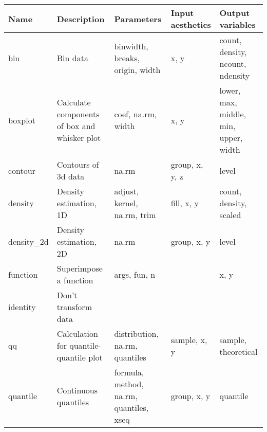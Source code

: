 \begin{table}
  \begin{center}
  \begin{tabular}{lp{1.5in}p{2in}p{1in}p{1.5in}}
    \toprule
    Name & Description & Parameters & Input \newline aesthetics & Output \newline variables \\
    \midrule
    bin          & Bin data                                                    & binwidth, breaks, origin, width                & x, y                            & count, density, ncount, ndensity     \\
    boxplot      & Calculate components of box and whisker plot                & coef, na.rm, width                             & x, y                            & lower, max, middle, min, upper, width\\
    contour      & Contours of 3d data                                         & na.rm                                          & group, x, y, z                  & level                                \\
    density      & Density estimation, 1D                                      & adjust, kernel, na.rm, trim                    & fill, x, y                      & count, density, scaled               \\
    density\_2d & Density estimation, 2D                                      & na.rm                                          & group, x, y                     & level                                \\
    function     & Superimpose a function                                      & args, fun, n                                   &                                 & x, y                                 \\
    identity     & Don't transform data                                        &                                                &                                 &                                      \\
    qq           & Calculation for quantile-quantile plot                      & distribution, na.rm, quantiles                 & sample, x, y                    & sample, theoretical                  \\
    quantile     & Continuous quantiles                                        & formula, method, na.rm, quantiles, xseq        & group, x, y                     & quantile                             \\

\end{tabular}
\end{center}
\end{table}
